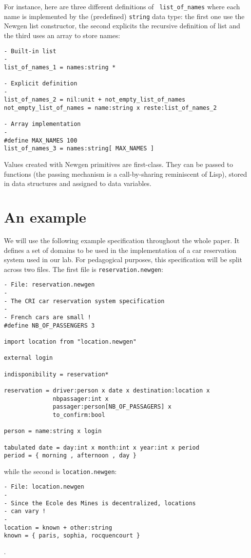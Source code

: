 For instance, here are three different definitions of {\tt
list\_of\_names} where each name is implemented by the (predefined)
{\tt string} data type: the first one use the Newgen list constructor,
the second explicits the recursive definition of list and the third uses
an array to store names:
\begin{verbatim}
- Built-in list
-
list_of_names_1 = names:string *

- Explicit definition
-
list_of_names_2 = nil:unit + not_empty_list_of_names
not_empty_list_of_names = name:string x reste:list_of_names_2

- Array implementation
-
#define MAX_NAMES 100
list_of_names_3 = names:string[ MAX_NAMES ]
\end{verbatim}

Values created with Newgen primitives are first-class. They can be
passed to functions (the passing mechanism is a call-by-sharing
reminiscent of Lisp), stored in data structures and assigned to data
variables. 

\section{An example}

We will use the following example specification throughout the whole
paper. It defines a set of domains to be used in the implementation of a
car reservation system used in our lab. For pedagogical purposes, this
specification will be split across two files.  The first file is
{\tt reservation.newgen}:
\begin{verbatim}
- File: reservation.newgen
-
- The CRI car reservation system specification
-
- French cars are small !
#define NB_OF_PASSENGERS 3

import location from "location.newgen"

external login

indisponibility = reservation*

reservation = driver:person x date x destination:location x
              nbpassager:int x 
              passager:person[NB_OF_PASSAGERS] x 
              to_confirm:bool

person = name:string x login

tabulated date = day:int x month:int x year:int x period
period = { morning , afternoon , day }
\end{verbatim}
while the second is {\tt location.newgen}:
\begin{verbatim}
- File: location.newgen
-
- Since the Ecole des Mines is decentralized, locations 
- can vary !
-
location = known + other:string
known = { paris, sophia, rocquencourt }
\end{verbatim}.


